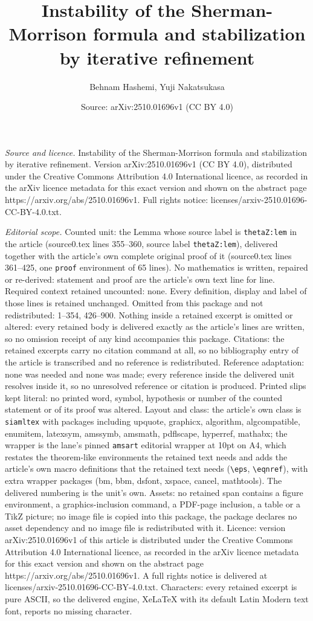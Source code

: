 \documentclass[10pt,a4paper]{amsart}
\title[Instability of the Sherman-Morrison formula and stabilizatio]{Instability of the Sherman-Morrison formula and stabilization by iterative refinement}
\author{Behnam Hashemi, Yuji Nakatsukasa}
\date{Source: arXiv:2510.01696v1 (CC BY 4.0)}
\begin{document}
\maketitle

\noindent\emph{Source and licence.} Instability of the Sherman-Morrison formula and stabilization by iterative refinement. Version arXiv:2510.01696v1 (CC BY 4.0), distributed under the Creative Commons Attribution 4.0 International licence, as recorded in the arXiv licence metadata for this exact version and shown on the abstract page https://arxiv.org/abs/2510.01696v1. Full rights notice: licenses/arxiv-2510.01696-CC-BY-4.0.txt.\par\smallskip

\noindent\textit{Editorial scope.} Counted unit: the Lemma whose source label is \texttt{thetaZ:lem} in the article (source0.tex lines 355--360, source label \texttt{thetaZ:lem}), delivered together with the article's own complete original proof of it (source0.tex lines 361--425, one \texttt{proof} environment of 65 lines). No mathematics is written, repaired or re-derived: statement and proof are the article's own text line for line. Required context retained uncounted: none. Every definition, display and label of those lines is retained unchanged. Omitted from this package and not redistributed: 1--354, 426--900. Nothing inside a retained excerpt is omitted or altered: every retained body is delivered exactly as the article's lines are written, so no omission receipt of any kind accompanies this package. Citations: the retained excerpts carry no citation command at all, so no bibliography entry of the article is transcribed and no reference is redistributed. Reference adaptation: none was needed and none was made; every reference inside the delivered unit resolves inside it, so no unresolved reference or citation is produced. Printed slips kept literal: no printed word, symbol, hypothesis or number of the counted statement or of its proof was altered. Layout and class: the article's own class is \texttt{siamltex} with packages including upquote, graphicx, algorithm, algcompatible, enumitem, latexsym, amssymb, amsmath, pdflscape, hyperref, mathabx; the wrapper is the lane's pinned \texttt{amsart} editorial wrapper at 10pt on A4, which restates the theorem-like environments the retained text needs and adds the article's own macro definitions that the retained text needs (\texttt{\textbackslash eps}, \texttt{\textbackslash eqnref}), with extra wrapper packages (bm, bbm, dsfont, xspace, cancel, mathtools). The delivered numbering is the unit's own. Assets: no retained span contains a figure environment, a graphics-inclusion command, a PDF-page inclusion, a table or a TikZ picture; no image file is copied into this package, the package declares no asset dependency and no image file is redistributed with it. Licence: version arXiv:2510.01696v1 of this article is distributed under the Creative Commons Attribution 4.0 International licence, as recorded in the arXiv licence metadata for this exact version and shown on the abstract page https://arxiv.org/abs/2510.01696v1. A full rights notice is delivered at licenses/arxiv-2510.01696-CC-BY-4.0.txt. Characters: every retained excerpt is pure ASCII, so the delivered engine, XeLaTeX with its default Latin Modern text font, reports no missing character.
\end{document}
